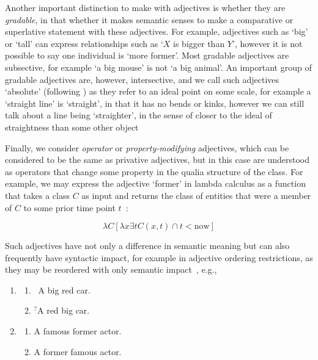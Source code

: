 \documentclass[11pt]{article}
\begin{document}
Another important distinction to make with adjectives is whether they are 
\emph{gradable}, in that whether it makes semantic senses to make a comparative 
or superlative statement with these adjectives. For example, adjectives such as 
`big' or `tall' can express relationships such as `$X$ is bigger than $Y$', 
however it is not possible to say one individual is `more former'. Most gradable 
adjectives are subsective, for example `a big mouse' is not `a big animal'\cite{morzycki2013nonscales}. An 
important group of gradable adjectives are, however, intersective, and we call 
such adjectives `absolute' (following \cite{rusiecki1985adjectives}) as they 
refer to an ideal point on some scale, for example a `straight line' is `straight', in 
that it has no bends or kinks, however we can still talk about a line being 
`straighter', in the sense of closer to the ideal of straightness than some other object

Finally, we consider \emph{operator} or \emph{property-modifying} adjectives, 
which can be considered to be the same as privative adjectives, but in this 
case are understood as operators that change some property in the qualia 
structure of the class. For example, we may express the adjective `former' 
in lambda calculus as a function that takes a class $C$ as input and returns the class 
of entities that were a member of $C$ to some prior time point $t$~\cite{partee2003there}:

$$\lambda C [\lambda x \exists t C(x,t) \cap t < \mathrm{now}]$$

Such adjectives have not only a difference in semantic meaning but can also 
frequently have syntactic impact, for example in adjective ordering 
restrictions, as they may be reordered with only semantic 
impact~\cite{teodorescu2006adjective}, e.g.,

\begin{enumerate}[resume]
\item \begin{enumerate}
\item \ A big red car.
\item $^?$A red big car.
\end{enumerate} 
\label{ex:car}
\item \begin{enumerate}
\item A famous former actor.
\item A former famous actor.
\end{enumerate}
\label{ex:actor}
\end{enumerate}
\end{document}
